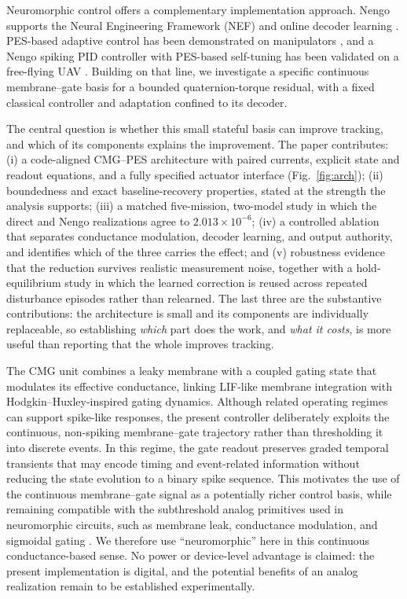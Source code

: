 \documentclass[letterpaper,10pt,conference]{IEEEtran}
\begin{document}
Neuromorphic control offers a complementary implementation approach.
Nengo supports the Neural Engineering Framework (NEF) and online decoder
learning \cite{bekolay2014nengo}. PES-based adaptive control has been
demonstrated on manipulators \cite{dewolf2016arm,dewolf2020nengo}, and a
Nengo spiking PID controller with PES-based self-tuning has been validated
on a free-flying UAV \cite{olivares2026selftuning}. Building on that line, we
investigate a specific continuous membrane--gate basis for a bounded
quaternion-torque residual, with a fixed classical controller and adaptation
confined to its decoder.

The central question is whether this small stateful basis can improve
tracking, and which of its components explains the improvement. The paper
contributes: (i) a code-aligned CMG--PES architecture with paired currents,
explicit state and readout equations, and a fully specified actuator
interface (Fig.~\ref{fig:arch}); (ii) boundedness and exact
baseline-recovery properties, stated at the strength the analysis supports;
(iii) a matched five-mission, two-model study in which the direct and Nengo
realizations agree to $2.013\times10^{-6}$; (iv) a controlled ablation that
separates conductance modulation, decoder learning, and output authority,
and identifies which of the three carries the effect; and (v) robustness
evidence that the reduction survives realistic measurement noise, together
with a hold-equilibrium study in which the learned correction is reused
across repeated disturbance episodes rather than relearned. The last three
are the substantive contributions: the architecture is small and its
components are individually replaceable, so establishing \emph{which} part
does the work, and \emph{what it costs}, is more useful than reporting that
the whole improves tracking.

The CMG unit combines a leaky membrane with a coupled gating state that modulates its effective conductance, linking LIF-like membrane integration with Hodgkin--Huxley-inspired gating dynamics. Although related operating regimes can support spike-like responses, the present controller deliberately exploits the continuous, non-spiking membrane--gate trajectory rather than thresholding it into discrete events. In this regime, the gate readout preserves graded temporal transients that may encode timing and event-related information without reducing the state evolution to a binary spike sequence. This motivates the use of the continuous membrane--gate signal as a potentially richer control basis, while remaining compatible with the subthreshold analog primitives used in neuromorphic circuits, such as membrane leak, conductance modulation, and sigmoidal gating \cite{mahowald1991vlsi}. We therefore use ``neuromorphic'' here in this continuous conductance-based sense. No power or device-level advantage is claimed: the present implementation is digital, and the potential benefits of an analog realization remain to be established experimentally.
\end{document}
